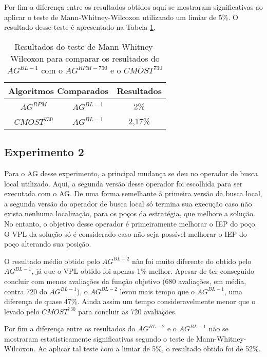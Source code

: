 Por fim a diferença entre os resultados obtidos aqui se mostraram significativas ao aplicar o teste de Mann-Whitney-Wilcoxon utilizando um limiar de 5\%. O resultado desse teste é apresentado na Tabela \ref{tab:mw6_2}.

\begin{table}[htb]
\centering
\caption{Resultados do teste de Mann-Whitney-Wilcoxon para comparar os resultados do $AG^{BL-1}$ com o $AG^{RPM-730}$ e o $CMOST^{730}$}
\label{tab:mw6_2}
\begin{tabular}{|c|c|c|}
\hline
\multicolumn{2}{|c|}{Algoritmos Comparados} & Resultados \\ \hline
$AG^{RPM}$  &  $AG^{BL-1}$ & 2\% \\ \hline
$CMOST^{730}$ & $AG^{BL-1}$ & 2,17\% \\ \hline

\end{tabular}
\end{table}

\subsection{Experimento 2}
\label{ch:5_Experimento7}
Para o AG desse experimento, a principal mudança se deu no operador de busca local utilizado. Aqui, a segunda versão desse operador foi escolhida para ser executada com o AG. De uma forma semelhante à primeira versão da busca local, a segunda versão do operador de busca local só termina sua execução caso não exista nenhuma localização, para os poços da estratégia, que melhore a solução. No entanto, o objetivo desse operador é primeiramente melhorar o IEP do poço. O VPL da solução só é considerado caso não seja possível melhorar o IEP do poço alterando sua posição.

O resultado médio obtido pelo $AG^{BL-2}$ não foi muito diferente do obtido pelo $AG^{BL-1}$, já que o VPL obtido foi apenas 1\% melhor. Apesar de ter conseguido concluir com menos avaliações da função objetivo (680 avaliações, em média, contra 720 do $AG^{BL-1}$), o $AG^{BL-2}$ levou mais tempo que o $AG^{BL-1}$, uma diferença de quase 47\%. Ainda assim um tempo consideravelmente menor que o levado pelo $CMOST^{730}$ para concluir as 720 avaliações.

Por fim a diferença entre os resultados do $AG^{BL-2}$ e o $AG^{BL-1}$ não se mostraram estatisticamente significativas segundo o teste de Mann-Whitney-Wilcoxon. Ao aplicar tal teste com a limiar de 5\%, o resultado obtido foi de 52\%.